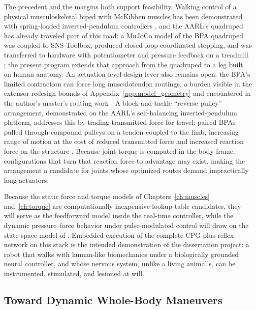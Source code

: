 The precedent and the margins both support feasibility. Walking control of a physical musculoskeletal biped with McKibben muscles has been demonstrated with spring-loaded inverted-pendulum controllers \citep{li_controller_2024}, and the AARL's quadruped has already traveled part of this road: a MuJoCo model of the BPA quadruped was coupled to SNS-Toolbox, produced closed-loop coordinated stepping, and was transferred to hardware with potentiometer and pressure feedback on a treadmill \citep{lutz_mechanical_2025}; the present program extends that approach from the quadruped to a leg built on human anatomy. An actuation-level design lever also remains open: the BPA's limited contraction can force long musculotendon routings, a burden visible in the extensor redesign bounds of Appendix~\ref{app:model_geometry} and encountered in the author's master's routing work \citep{bolen_determination_2019}. A block-and-tackle ``reverse pulley'' arrangement, demonstrated on the AARL's self-balancing inverted-pendulum platform, addresses this by trading transmitted force for travel: paired BPAs pulled through compound pulleys on a tendon coupled to the limb, increasing range of motion at the cost of reduced transmitted force and increased reaction force on the structure \citep{bolen_balance_2024, bolen_selfbalancing_2024, bolen_selfbalancing_srs_2024}. Because joint torque is computed in the body frame, configurations that turn that reaction force to advantage may exist, making the arrangement a candidate for joints whose optimized routes demand impractically long actuators.

Because the static force and torque models of Chapters~\ref{ch:muscles} and~\ref{ch:torque} are computationally inexpensive lookup-table candidates, they will serve as the feedforward model inside the real-time controller, while the dynamic pressure--force behavior under pulse-modulated control will draw on the state-space model of \citet{elzein_pressure_2025}. Embedded execution of the complete CPG-plus-reflex network on this stack is the intended demonstration of the dissertation project: a robot that walks with human-like biomechanics under a biologically grounded neural controller, and whose nervous system, unlike a living animal's, can be instrumented, stimulated, and lesioned at will.

\subsection{Toward Dynamic Whole-Body Maneuvers}\label{sec:fw_kickflip}

